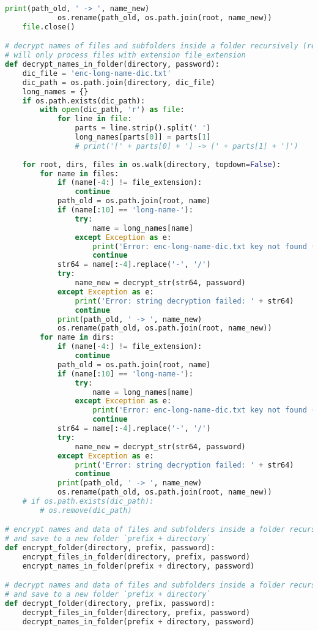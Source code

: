 \begin{lstlisting}[language=python,caption=encrypt.py]
			print(path_old, ' -> ', name_new)
			os.rename(path_old, os.path.join(root, name_new))
	file.close()

# decrypt names of files and subfolders inside a folder recursively (rename)
# will only process files with extension file_extension
def decrypt_names_in_folder(directory, password):
	dic_file = 'enc-long-name-dic.txt'
	dic_path = os.path.join(directory, dic_file)
	long_names = {}
	if os.path.exists(dic_path):
		with open(dic_path, 'r') as file:
			for line in file:
				parts = line.strip().split(' ')
				long_names[parts[0]] = parts[1]
				# print('[' + parts[0] + '] -> [' + parts[1] + ']')
				
	for root, dirs, files in os.walk(directory, topdown=False):
		for name in files:
			if (name[-4:] != file_extension):
			 	continue
			path_old = os.path.join(root, name)
			if (name[:10] == 'long-name-'):
				try:
					name = long_names[name]
				except Exception as e:
					print('Error: enc-long-name-dic.txt key not found (will skip): ' + name)
					continue
			str64 = name[:-4].replace('-', '/')
			try:
				name_new = decrypt_str(str64, password)
			except Exception as e:
				print('Error: string decryption failed: ' + str64)
				continue
			print(path_old, ' -> ', name_new)
			os.rename(path_old, os.path.join(root, name_new))
		for name in dirs:
			if (name[-4:] != file_extension):
			 	continue
			path_old = os.path.join(root, name)
			if (name[:10] == 'long-name-'):
				try:
					name = long_names[name]
				except Exception as e:
					print('Error: enc-long-name-dic.txt key not found (will skip): ' + name)
					continue
			str64 = name[:-4].replace('-', '/')
			try:
				name_new = decrypt_str(str64, password)
			except Exception as e:
				print('Error: string decryption failed: ' + str64)
				continue
			print(path_old, ' -> ', name_new)
			os.rename(path_old, os.path.join(root, name_new))
	# if os.path.exists(dic_path):
		# os.remove(dic_path)

# encrypt names and data of files and subfolders inside a folder recursively
# and save to a new folder `prefix + directory`
def encrypt_folder(directory, prefix, password):
	encrypt_files_in_folder(directory, prefix, password)
	encrypt_names_in_folder(prefix + directory, password)

# decrypt names and data of files and subfolders inside a folder recursively
# and save to a new folder `prefix + directory`
def decrypt_folder(directory, prefix, password):
	decrypt_files_in_folder(directory, prefix, password)
	decrypt_names_in_folder(prefix + directory, password)
\end{lstlisting}
